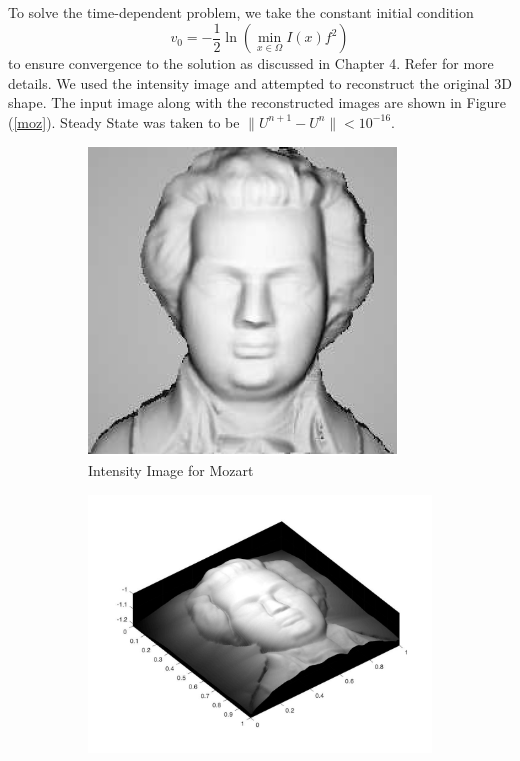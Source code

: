 \noindent
To solve the time-dependent problem, we take the constant initial condition
\begin{equation}
	v_0 = -\frac{1}{2}\ln(\min_{x\in\Omega} I(x)f^2)
\end{equation}
to ensure convergence to the solution as discussed in Chapter 4. Refer \cite{prados2} for more details. We used the intensity image and attempted to reconstruct the original 3D shape. The input image along with the reconstructed images are shown in Figure (\ref{moz}). Steady State was taken to be $\lVert U^{n+1} - U^n \rVert < 10^{-16}$.
\begin{center}
	\begin{figure}
	\begin{subfigure}{0.5\textwidth}
		\centering
		\includegraphics[scale = 0.85]{Images/moz.png}
		\caption{Intensity Image for Mozart}
	\end{subfigure}
	\begin{subfigure}{0.5\textwidth}
				\centering
				\includegraphics[scale = 0.24]{Images/moz.jpg}

\end{subfigure}
\end{figure}
\end{center}
